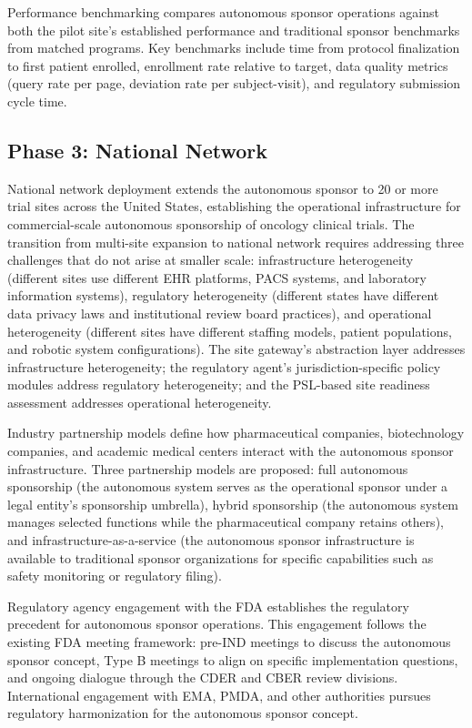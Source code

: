 Performance benchmarking compares autonomous sponsor operations against both the pilot
site's established performance and traditional sponsor benchmarks from matched programs.
Key benchmarks include time from protocol finalization to first patient enrolled,
enrollment rate relative to target, data quality metrics (query rate per page, deviation
rate per subject-visit), and regulatory submission cycle time.

\subsection{Phase 3: National Network}

National network deployment extends the autonomous sponsor to 20 or more trial sites
across the United States, establishing the operational infrastructure for commercial-scale
autonomous sponsorship of oncology clinical trials. The transition from multi-site expansion
to national network requires addressing three challenges that do not arise at smaller scale:
infrastructure heterogeneity (different sites use different EHR platforms, PACS systems, and
laboratory information systems), regulatory heterogeneity (different states have different
data privacy laws and institutional review board practices), and operational heterogeneity
(different sites have different staffing models, patient populations, and robotic system
configurations). The site gateway's abstraction layer addresses infrastructure heterogeneity;
the regulatory agent's jurisdiction-specific policy modules address regulatory heterogeneity;
and the PSL-based site readiness assessment addresses operational heterogeneity.

Industry partnership models define how pharmaceutical companies, biotechnology companies,
and academic medical centers interact with the autonomous sponsor infrastructure. Three
partnership models are proposed: full autonomous sponsorship (the autonomous system
serves as the operational sponsor under a legal entity's sponsorship umbrella), hybrid
sponsorship (the autonomous system manages selected functions while the pharmaceutical
company retains others), and infrastructure-as-a-service (the autonomous sponsor
infrastructure is available to traditional sponsor organizations for specific capabilities
such as safety monitoring or regulatory filing).

Regulatory agency engagement with the FDA establishes the regulatory precedent for
autonomous sponsor operations. This engagement follows the existing FDA meeting framework:
pre-IND meetings to discuss the autonomous sponsor concept, Type B meetings to align on
specific implementation questions, and ongoing dialogue through the CDER and CBER review
divisions. International engagement with EMA, PMDA, and other authorities pursues
regulatory harmonization for the autonomous sponsor concept.

